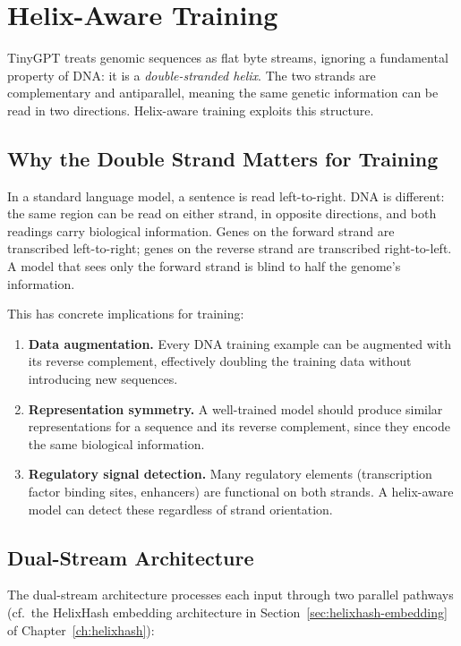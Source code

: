 \section{Helix-Aware Training}
\label{sec:helix-aware}

TinyGPT treats genomic sequences as flat byte streams, ignoring a fundamental property of DNA: it is a \emph{double-stranded helix}. The two strands are complementary and antiparallel, meaning the same genetic information can be read in two directions. Helix-aware training exploits this structure.

\subsection{Why the Double Strand Matters for Training}

In a standard language model, a sentence is read left-to-right. DNA is different: the same region can be read on either strand, in opposite directions, and both readings carry biological information. Genes on the forward strand are transcribed left-to-right; genes on the reverse strand are transcribed right-to-left. A model that sees only the forward strand is blind to half the genome's information.

This has concrete implications for training:

\begin{enumerate}[leftmargin=1.5em]
  \item \textbf{Data augmentation.} Every DNA training example can be augmented with its reverse complement, effectively doubling the training data without introducing new sequences.
  \item \textbf{Representation symmetry.} A well-trained model should produce similar representations for a sequence and its reverse complement, since they encode the same biological information.
  \item \textbf{Regulatory signal detection.} Many regulatory elements (transcription factor binding sites, enhancers) are functional on both strands. A helix-aware model can detect these regardless of strand orientation.
\end{enumerate}

\subsection{Dual-Stream Architecture}

The dual-stream architecture processes each input through two parallel pathways (cf.\ the HelixHash embedding architecture in Section~\ref{sec:helixhash-embedding} of Chapter~\ref{ch:helixhash}):

